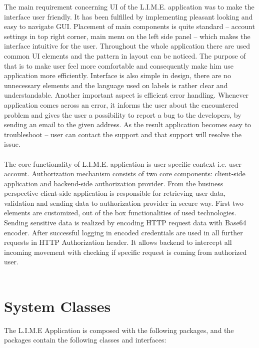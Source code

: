 \documentclass[a4paper,11pt,twoside]{report}
\theoremstyle{definition}
\begin{document}
The main requirement concerning UI of the L.I.M.E. application was to make the interface user friendly. It has been fulfilled by implementing pleasant looking and easy to navigate GUI. Placement of main components is quite standard – account settings in top right corner, main menu on the left side panel – which makes the interface intuitive for the user. Throughout the whole application there are used common UI elements and the pattern in layout can be noticed. The purpose of that is to make user feel more comfortable and consequently make him use application more efficiently. Interface is also simple in design, there are no unnecessary elements and the language used on labels is rather clear and understandable. Another important aspect is efficient error handling. Whenever application comes across an error, it informs the user about the encountered problem and gives the user a possibility to report a bug to the developers, by sending an email to the given address. As the result application becomes easy to troubleshoot – user can contact the support and that support will resolve the issue. \\ \\

The core functionality of L.I.M.E. application is user specific context i.e. user account. Authorization mechanism consists of two core components: client-side application and backend-side authorization provider. From the business perspective client-side application is responsible for retrieving user data, validation and sending data to authorization provider in secure way. First two elements are customized, out of the box functionalities of used technologies. Sending sensitive data is realized by encoding HTTP request data with Base64 encoder. After successful logging in encoded credentials are used in all further requests in HTTP Authorization header. It allows backend to intercept all incoming movement with checking if specific request is coming from authorized user.\\ \\


\section{System Classes}

The L.I.M.E Application is composed with the following packages, and the packages contain the following classes and interfaces:
\end{document}
